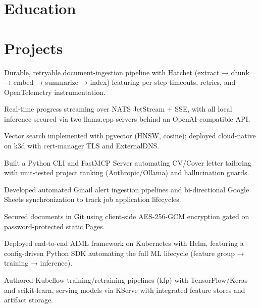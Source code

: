 \documentclass[10pt,a4paper]{resume}
\begin{document}
\section{Education}

\vspace{2pt}

\section{Projects}

\bullets
  \item Durable, retryable document-ingestion pipeline with Hatchet (extract → chunk → embed → summarize → index) featuring per-step timeouts, retries, and OpenTelemetry instrumentation.
  \item Real-time progress streaming over NATS JetStream + SSE, with all local inference secured via two llama.cpp servers behind an OpenAI-compatible API.
  \item Vector search implemented with pgvector (HNSW, cosine); deployed cloud-native on k3d with cert-manager TLS and ExternalDNS.
\bulletsend
\vspace{1.0pt}
\bullets
  \item Built a Python CLI and FastMCP Server automating CV/Cover letter tailoring with unit-tested project ranking (Anthropic/Ollama) and hallucination guards.
  \item Developed automated Gmail alert ingestion pipelines and bi-directional Google Sheets synchronization to track job application lifecycles.
  \item Secured documents in Git using client-side AES-256-GCM encryption gated on password-protected static Pages.
\bulletsend
\vspace{1.0pt}
\bullets
  \item Deployed end-to-end AIML framework on Kubernetes with Helm, featuring a config-driven Python SDK automating the full ML lifecycle (feature group → training → inference).
  \item Authored Kubeflow training/retraining pipelines (kfp) with TensorFlow/Keras and scikit-learn, serving models via KServe with integrated feature stores and artifact storage.
\bulletsend
\end{document}
